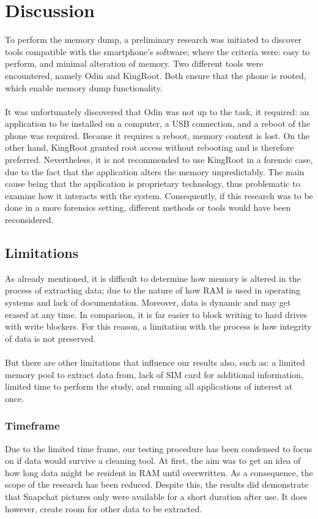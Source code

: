 \section{Discussion}
To perform the memory dump, a preliminary research was initiated to discover tools compatible with the smartphone's software; where the criteria were: easy to perform, and minimal alteration of memory. Two different tools were encountered, namely Odin and KingRoot. Both ensure that the phone is rooted, which enable memory dump functionality.\\\\
It was unfortunately discovered that Odin was not up to the task, it required: an application to be installed on a computer, a USB connection, and a reboot of the phone was required. Because it requires a reboot, memory content is lost. On the other hand, KingRoot granted root access without rebooting and is therefore preferred. Nevertheless, it is not recommended to use KingRoot in a forensic case, due to the fact that the application alters the memory unpredictably. The main cause being that the application is proprietary technology, thus problematic to examine how it interacts with the system. Consequently, if this research was to be done in a more forensics setting, different methods or tools would have been reconsidered.
\subsection{Limitations}
As already mentioned, it is difficult to determine how memory is altered in the process of extracting data; due to the nature of how RAM is used in operating systems and lack of documentation. Moreover, data is dynamic and may get erased at any time. In comparison, it is far easier to block writing to hard drives with write blockers. For this reason, a limitation with the process is how integrity of data is not preserved.\\\\
But there are other limitations that influence our results also, such as: a limited memory pool to extract data from, lack of SIM card for additional information, limited time to perform the study, and running all applications of interest at once.

\subsubsection{Timeframe}
Due to the limited time frame, our testing procedure has been condensed to focus on if data would survive a cleaning tool. At first, the aim was to get an idea of how long data might be resident in RAM until overwritten. As a consequence, the scope of the research has been reduced. Despite this, the results did demonstrate that Snapchat pictures only were available for a short duration after use. It does however, create room for other data to be extracted.
